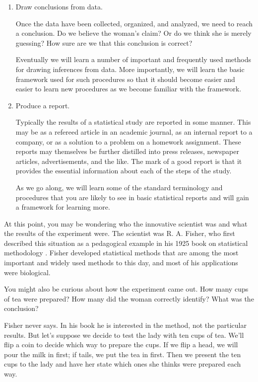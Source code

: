 \begin{enumerate}
  \item Draw conclusions from data.

	Once the data have been collected, organized, and analyzed, we need
	to reach a conclusion.  
	Do we believe the woman's claim?  
	Or do we think she is merely guessing?  How sure are we that this
	conclusion is correct?

	Eventually we will
	learn a number of important and frequently used methods for 
	drawing inferences from data.  More importantly, we will learn
	the basic framework used for such procedures so that it should 
	become easier and easier to learn new procedures as we become 
	familiar with the framework.
	

  \item Produce a report.

		Typically the results of a statistical study are reported in 
		some manner.  This may be as a refereed article in an academic 
		journal, as an internal report to a company, or as a solution
		to a problem on a homework assignment.  These reports may themselves
		be further distilled into press releases, newspaper articles,
		advertisements, and the like.  The mark of a good report
		is that it provides the essential information about each 
		of the steps of the study.

		As we go along, we will learn some of the standard terminology and
		procedures that you are likely to see in basic statistical reports and 
		will gain a framework for learning more.  
\end{enumerate}

\fi

At this point, you may be wondering who the innovative scientist was and 
what the results of the experiment were.
%
The scientist was R. A. Fisher, who first described this situation
as a pedagogical example in his 1925 book on 
statistical methodology \cite{Fisher:1925:Methods}.
Fisher developed statistical methods that are among the most
important and widely used methods to this day, and most of his 
applications were biological.
\nocite{Fisher:1970:Methods}%

You might also be curious about how the experiment came out.
How many cups of tea were prepared?  How many did the woman 
correctly identify?  What was the conclusion?

Fisher never says.  In his book he is interested in the method, not the 
particular results.  But let's suppose we decide to test the lady with
ten cups of tea.  
We'll flip a coin to decide which way to prepare the cups.  
If we flip a head, we will pour the milk in first; if tails, we 
put the tea in first.
Then we present the ten cups to the lady and have her state which ones she
thinks were prepared each way.  

